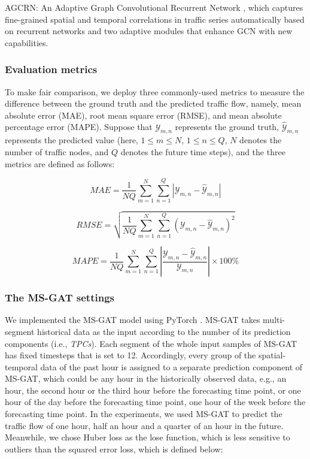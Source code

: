AGCRN: An Adaptive Graph Convolutional Recurrent Network \cite{bai2020adaptive}, which captures fine-grained spatial and temporal correlations in traffic series automatically based on recurrent networks and two adaptive modules that enhance GCN with new capabilities. 

\subsubsection{Evaluation metrics}
To make fair comparison, we deploy three commonly-used metrics to measure the difference between the ground truth and the predicted traffic flow, namely, mean absolute error (MAE), root mean square error (RMSE), and mean absolute percentage error (MAPE). Suppose that $\mathcal{Y}_{m,n}$ represents the ground truth, $\hat{\mathcal{Y}}_{m,n}$ represents the predicted value (here, $1 \leq m \leq N$, $1 \leq n \leq Q$, $N$ denotes the number of traffic nodes, and $Q$ denotes the future time steps), and the three metrics are defined as follows:

\begin{equation}
    \label{eqn:mae}
    MAE = \frac{1}{NQ} \sum\limits_{m=1}^{N}\sum\limits_{n=1}^{Q} \left | \mathcal{Y}_{m,n} - \hat{\mathcal{Y}}_{m,n} \right |
\end{equation}

\begin{equation}
    \label{eqn:rmse}
    RMSE = \sqrt{\frac{1}{NQ} \sum\limits_{m=1}^{N}\sum\limits_{n=1}^{Q} \left ( \mathcal{Y}_{m,n} - \hat{\mathcal{Y}}_{m,n} \right )^2}
\end{equation}

\begin{equation}
    \label{eqn:mape}
    MAPE = \frac{1}{NQ} \sum\limits_{m=1}^{N}\sum\limits_{n=1}^{Q} \left | \frac{ \mathcal{Y}_{m,n} - \hat{\mathcal{Y}}_{m,n}}{\mathcal{Y}_{m,n}} \right | \times 100 \%
\end{equation}

\subsubsection{The MS-GAT settings}
We implemented the MS-GAT model using PyTorch \cite{ketkar2017introduction}. MS-GAT takes multi-segment historical data as the input according to the number of its prediction components (i.e., \textit{TPCs}). Each segment of the whole input samples of MS-GAT has fixed timesteps that is set to 12. Accordingly, every group of the spatial-temporal data of the past hour is assigned to a separate prediction component of MS-GAT, which could be any hour in the historically observed data, e.g., an hour, the second hour or the third hour before the forecasting time point, or one hour of the day before the forecasting time point, one hour of the week before the forecasting time point. In the experiments, we used MS-GAT to predict the traffic flow of one hour, half an hour and a quarter of an hour in the future. Meanwhile, we chose Huber loss \cite{huber1992robust} as the lose function, which is less sensitive to outliers than the squared error loss, which is defined below:

